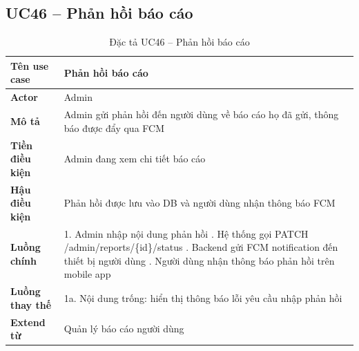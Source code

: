 \subsection*{UC46 -- Phản hồi báo cáo}
\begin{table}[H]
    \captionsetup{justification=raggedright, singlelinecheck=false}
    \caption{Đặc tả UC46 -- Phản hồi báo cáo}
\centering
\begin{tabular}{|p{3.5cm}|p{10cm}|}
\hline
\textbf{Tên use case} & Phản hồi báo cáo \\
\hline
\textbf{Actor} & Admin \\
\hline
\textbf{Mô tả} & Admin gửi phản hồi đến người dùng về
  báo cáo họ đã gửi, thông báo được đẩy qua FCM \\
\hline
\textbf{Tiền điều kiện} & Admin đang xem chi tiết báo cáo \\
\hline
\textbf{Hậu điều kiện} & Phản hồi được lưu vào DB và
  người dùng nhận thông báo FCM \\
\hline
\textbf{Luồng chính} &
  1. Admin nhập nội dung phản hồi \newline
  2. Hệ thống gọi PATCH /admin/reports/\{id\}/status \newline
  3. Backend gửi FCM notification đến thiết bị người dùng \newline
  4. Người dùng nhận thông báo phản hồi trên mobile app \\
\hline
\textbf{Luồng thay thế} &
  1a. Nội dung trống: hiển thị thông báo lỗi yêu cầu
  nhập phản hồi \\
\hline
\textbf{Extend từ} & Quản lý báo cáo người dùng \\
\hline
\end{tabular}

\end{table}
